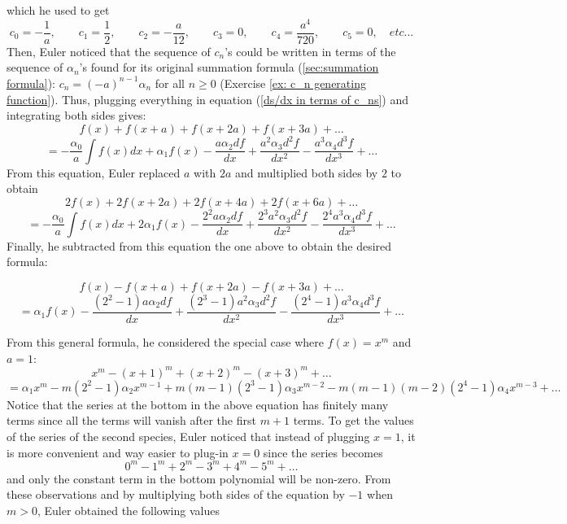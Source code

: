which he used to get
$$c_0 = -\frac{1}{a}, \qquad c_1 = \frac{1}{2}, \qquad c_2 = -\frac{a}{12}, \qquad c_3 = 0, \qquad c_4 = \frac{a^4}{720}, \qquad c_5 =0, \quad etc ...$$
Then, Euler noticed that the sequence of $c_n$'s could be written in terms of the sequence of $\alpha_n$'s found for its original summation formula (\autoref{sec:summation formula}): $c_n = (-a)^{n-1}\alpha_n$ for all $n \geq 0$ (Exercise \ref{ex: c_n generating function}). Thus, plugging everything in equation (\ref{ds/dx in terms of c_ns}) and integrating both sides gives:
$$f(x) + f(x + a) + f(x + 2a) + f(x + 3a) + \dots$$
$$= - \frac{\alpha_0}{a}\int f(x) dx + \alpha_1f(x) - \frac{a\alpha_2 df}{dx} + \frac{a^2 \alpha_3 d^2f}{dx^2} - \frac{a^3 \alpha_4 d^3f}{dx^3} + \dots$$
From this equation, Euler replaced $a$ with $2a$ and multiplied both sides by $2$ to obtain
$$2f(x) + 2f(x + 2a) + 2f(x + 4a) + 2f(x + 6a) + \dots$$
$$= - \frac{\alpha_0}{a}\int f(x) dx + 2\alpha_1f(x) - \frac{2^2a\alpha_2 df}{dx} + \frac{2^3a^2 \alpha_3 d^2f}{dx^2} - \frac{2^4a^3 \alpha_4 d^3f}{dx^3} + \dots$$
Finally, he subtracted from this equation the one above to obtain the desired formula:
\begin{center}
$$f(x) - f(x + a) + f(x + 2a) - f(x + 3a) + \dots$$
$$= \alpha_1f(x) - \frac{(2^2-1)a\alpha_2 df}{dx} + \frac{(2^3-1)a^2 \alpha_3 d^2f}{dx^2} - \frac{(2^4-1)a^3 \alpha_4 d^3f}{dx^3} + \dots$$
\end{center}
From this general formula, he considered the special case where $f(x) = x^m$ and $a = 1$:
$$x^m - (x + 1)^m + (x + 2)^m - (x + 3)^m + \dots$$
$$= \alpha_1x^m - m(2^2-1)\alpha_2x^{m-1} + m(m-1)(2^3-1) \alpha_3x^{m-2} - m(m-1)(m-2)(2^4-1) \alpha_4 x^{m-3} + \dots$$
Notice that the series at the bottom in the above equation has finitely many terms since all the terms will vanish after the first $m+1$ terms. To get the values of the series of the second species, Euler noticed that instead of plugging $x = 1$, it is more convenient and way easier to plug-in $x = 0$ since the series becomes
$$0^m - 1^m + 2^m - 3^m + 4^m - 5^m + \dots$$
and only the constant term in the bottom polynomial will be non-zero. From these observations and by multiplying both sides of the equation by $-1$ when $m > 0$, Euler obtained the following values

